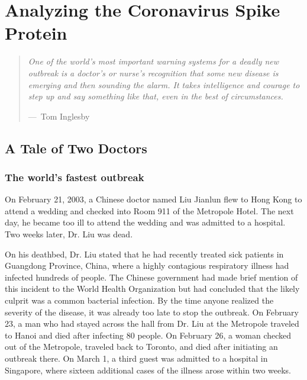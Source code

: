 \chapter[Analyzing the Coronavirus Spike Protein]{Analyzing the Coronavirus Spike Protein}
\label{chapter:coronavirus}
\renewcommand{\chaptertitle}{Analyzing the Coronavirus Spike Protein}


\FloatBarrier

\begin{quote}
\textit{One of the world's most important warning systems for a deadly new outbreak is a doctor's or nurse's recognition that some new disease is emerging and then sounding the alarm. It takes intelligence and courage to step up and say something like that, even in the best of circumstances.}

\begin{flushright}---~Tom Inglesby\end{flushright}
\end{quote}

\section{A Tale of Two Doctors}
\label{sec:coronavirus_introduction}

\FloatBarrier
{}
\subsection{The world's fastest outbreak}

On February 21, 2003, a Chinese doctor named Liu Jianlun flew to Hong Kong to attend a wedding and checked into Room 911 of the Metropole Hotel. The next day, he became too ill to attend the wedding and was admitted to a hospital. Two weeks later, Dr. Liu was dead.

On his deathbed, Dr. Liu stated that he had recently treated sick patients in Guangdong Province, China, where a highly contagious respiratory illness had infected hundreds of people. The Chinese government had made brief mention of this incident to the World Health Organization but had concluded that the likely culprit was a common bacterial infection. By the time anyone realized the severity of the disease, it was already too late to stop the outbreak. On February 23, a man who had stayed across the hall from Dr. Liu at the Metropole traveled to Hanoi and died after infecting 80 people. On February 26, a woman checked out of the Metropole, traveled back to Toronto, and died after initiating an outbreak there. On March 1, a third guest was admitted to a hospital in Singapore, where sixteen additional cases of the illness arose within two weeks.

